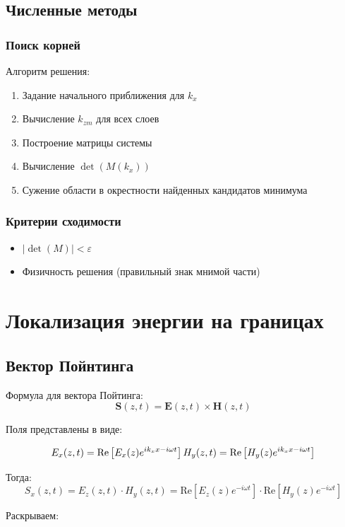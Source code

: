 \documentclass{article}
\begin{document}
\subsection{Численные методы}
\subsubsection{Поиск корней}
Алгоритм решения:
\begin{enumerate}
\item Задание начального приближения для $k_x$
\item Вычисление $k_{zm}$ для всех слоев
\item Построение матрицы системы
\item Вычисление $\det(M(k_x))$
\item Сужение области в окрестности найденных кандидатов минимума
\end{enumerate}

\subsubsection{Критерии сходимости}
\begin{itemize}
\item $|\det(M)| < \varepsilon$
\item Физичность решения (правильный знак мнимой части)
\end{itemize}

\clearpage

\section{Локализация энергии на границах}
\subsection{Вектор Пойнтинга}

Формула для вектора Пойтинга:
$$
\mathbf{S}(z, t) = \mathbf{E}(z, t) \times \mathbf{H}(z, t)
$$

Поля представлены в виде:

$$
E_x(z,t) = \text{Re}\left[ E_x(z) e^{i k_x x - i \omega t} \right] \\
H_y(z,t) = \text{Re}\left[ H_y(z) e^{i k_x x - i \omega t} \right]
$$

Тогда:
$$
S_x(z,t) = E_z(z,t) \cdot H_y(z,t)
= \text{Re}\left[ E_z(z) e^{-i\omega t} \right] \cdot \text{Re}\left[ H_y(z) e^{-i\omega t} \right]
$$

Раскрываем:
\end{document}
